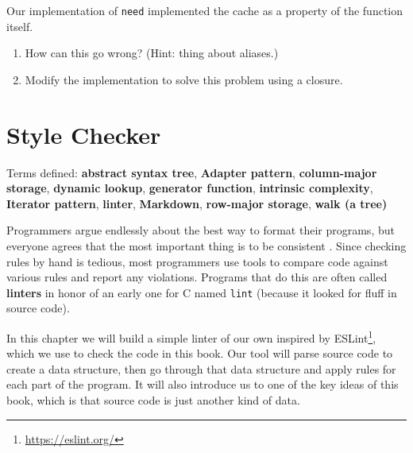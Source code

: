 \documentclass[krantzl]{krantz}
\newcommand{\glossref}[1]{\textbf{#1}}
\newcommand{\hreffoot}[2]{{#1}\footnote{\href{#2}{#2}}}
\begin{document}
Our implementation of \texttt{need} implemented the cache as a property of the function itself.

\begin{enumerate}

\item 

How can this go wrong?
    (Hint: thing about aliases.)



\item 

Modify the implementation to solve this problem using a closure.



\end{enumerate}

\chapter{Style Checker}\label{style-checker}


\noindent 
  Terms defined: \glossref{abstract syntax tree}, \glossref{Adapter pattern}, \glossref{column-major storage}, \glossref{dynamic lookup}, \glossref{generator function}, \glossref{intrinsic complexity}, \glossref{Iterator pattern}, \glossref{linter}, \glossref{Markdown}, \glossref{row-major storage}, \glossref{walk (a tree)}



Programmers argue endlessly about the best way to format their programs,
but everyone agrees that the most important thing is to be consistent
\cite{Binkley2012,Johnson2019}.
Since checking rules by hand is tedious,
most programmers use tools to compare code against various rules and report any violations.
Programs that do this are often called \glossref{linters}
in honor of an early one for C named \texttt{lint}
(because it looked for fluff in source code).


In this chapter we will build a simple linter of our own inspired by \hreffoot{ESLint}{https://eslint.org/},
which we use to check the code in this book.
Our tool will parse source code to create a data structure,
then go through that data structure and apply rules for each part of the program.
It will also introduce us to one of the key ideas of this book,
which is that source code is just another kind of data.
\end{document}
